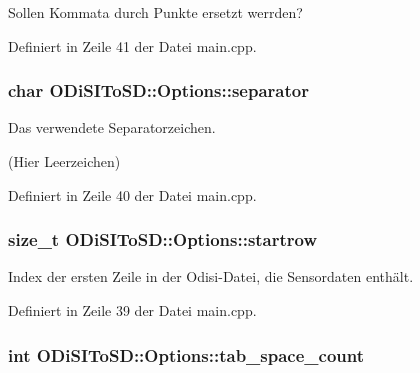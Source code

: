 Sollen Kommata durch Punkte ersetzt werrden? 



Definiert in Zeile 41 der Datei main.\-cpp.

\hypertarget{structODiSIToSD_1_1Options_a5621362ac3b707242893629db592f994}{
\subsubsection[{separator}]{\setlength{\rightskip}{0pt plus 5cm}char O\-Di\-S\-I\-To\-S\-D\-::\-Options\-::separator}}\label{structODiSIToSD_1_1Options_a5621362ac3b707242893629db592f994}


Das verwendete Separatorzeichen. 

(Hier Leerzeichen) 

Definiert in Zeile 40 der Datei main.\-cpp.

\hypertarget{structODiSIToSD_1_1Options_ac5138441572e68637dee8052f3c97240}{
\subsubsection[{startrow}]{\setlength{\rightskip}{0pt plus 5cm}size\-\_\-t O\-Di\-S\-I\-To\-S\-D\-::\-Options\-::startrow}}\label{structODiSIToSD_1_1Options_ac5138441572e68637dee8052f3c97240}


Index der ersten Zeile in der Odisi-\/\-Datei, die Sensordaten enthält. 



Definiert in Zeile 39 der Datei main.\-cpp.

\hypertarget{structODiSIToSD_1_1Options_a6c1e796c1c96e350f7f01982ccc2b32f}{
\subsubsection[{tab\-\_\-space\-\_\-count}]{\setlength{\rightskip}{0pt plus 5cm}int O\-Di\-S\-I\-To\-S\-D\-::\-Options\-::tab\-\_\-space\-\_\-count}}\label{structODiSIToSD_1_1Options_a6c1e796c1c96e350f7f01982ccc2b32f}


